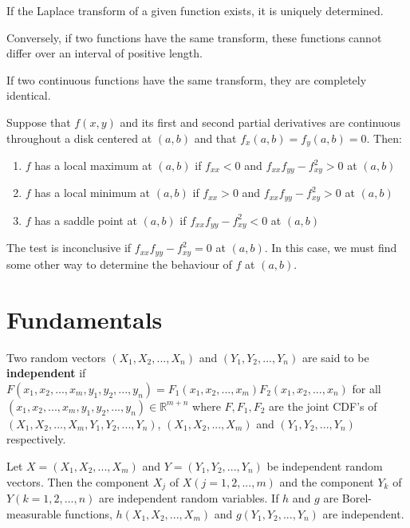 \begin{prop}
    If the Laplace transform of a given function exists, it is uniquely determined.
    
    Conversely, if two functions have the same transform, these functions cannot differ over an interval of positive length.

    If two continuous functions have the same transform, they are completely identical.
\end{prop}

\begin{prop}
    Suppose that $f(x,y)$ and its first and second partial derivatives are continuous throughout a disk centered at $(a,b)$ and that $f_x(a,b) = f_y(a,b) = 0$. Then:
    \begin{enumerate}
        \item $f$ has a local maximum at $(a,b)$ if $f_{xx} < 0$ and $f_{xx}f_{yy} - f_{xy}^2 > 0$ at $(a,b)$
        \item $f$ has a local minimum at $(a,b)$ if $f_{xx} > 0$ and $f_{xx}f_{yy} - f_{xy}^2 > 0$ at $(a,b)$
        \item $f$ has a saddle point at $(a,b)$ if $f_{xx}f_{yy} - f_{xy}^2 < 0$ at $(a,b)$
    \end{enumerate}
    The test is inconclusive if $f_{xx}f_{yy} - f_{xy}^2 = 0$ at $(a,b)$. In this case, we must find some other way to determine the behaviour of $f$ at $(a,b)$.
\end{prop}

\hhrule
\section*{Fundamentals}

\begin{defn}
    Two random vectors $(X_1, X_2, ... , X_n)$ and $(Y_1, Y_2, ... , Y_n)$ are said to be \textbf{independent} if $F(x_1, x_2, ..., x_m, y_1, y_2, ..., y_n) = F_1 (x_1, x_2, ..., x_m) F_2 (x_1, x_2, ..., x_n)$ for all $(x_1, x_2, ..., x_m, y_1, y_2, ..., y_n) \in \mathbb{R}^{m+n}$ where $F, F_1, F_2$ are the joint CDF's of $(X_1, X_2, ..., X_m, Y_1, Y_2, ..., Y_n)$, $(X_1, X_2, ..., X_m)$ and $(Y_1, Y_2, ..., Y_n)$ respectively.
\end{defn}

\begin{thm}
    Let $X = (X_1, X_2, ... , X_m)$ and $Y = (Y_1, Y_2, ... , Y_n)$ be independent random vectors. Then the component $X_j$ of $X(j = 1, 2, ... , m)$ and the component $Y_k$ of $Y(k = 1, 2, ... , n)$ are independent random variables. If $h$ and $g$ are Borel-measurable functions, $h(X_1, X_2, ..., X_m)$ and $g(Y_1, Y_2, ... , Y_n)$ are independent.
\end{thm}

